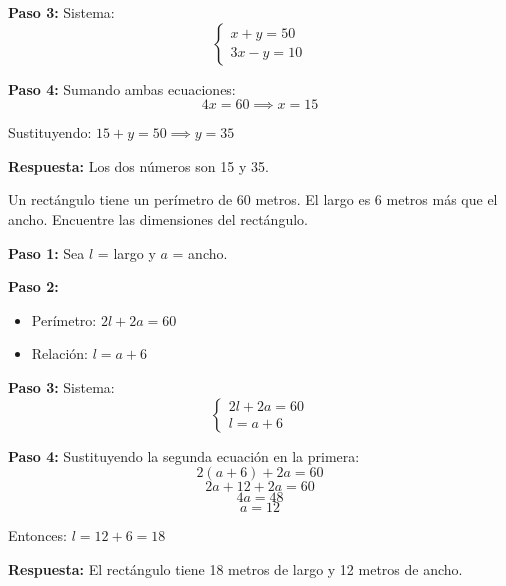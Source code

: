 \begin{exercise}
\begin{solucion}
\textbf{Paso 3:} Sistema:
$$\begin{cases}
x + y = 50 \\
3x - y = 10
\end{cases}$$

\textbf{Paso 4:} Sumando ambas ecuaciones:
$$4x = 60 \implies x = 15$$

Sustituyendo: $15 + y = 50 \implies y = 35$

\textbf{Respuesta:} Los dos números son 15 y 35.
\end{solucion}

\problem Un rectángulo tiene un perímetro de 60 metros. El largo es 6 metros más que el ancho. Encuentre las dimensiones del rectángulo.

\begin{solucion}
\textbf{Paso 1:} Sea $l$ = largo y $a$ = ancho.

\textbf{Paso 2:}
\begin{itemize}
    \item Perímetro: $2l + 2a = 60$
    \item Relación: $l = a + 6$
\end{itemize}

\textbf{Paso 3:} Sistema:
$$\begin{cases}
2l + 2a = 60 \\
l = a + 6
\end{cases}$$

\textbf{Paso 4:} Sustituyendo la segunda ecuación en la primera:
$$2(a + 6) + 2a = 60$$
$$2a + 12 + 2a = 60$$
$$4a = 48$$
$$a = 12$$

Entonces: $l = 12 + 6 = 18$

\textbf{Respuesta:} El rectángulo tiene 18 metros de largo y 12 metros de ancho.
\end{solucion}
\end{exercise}
